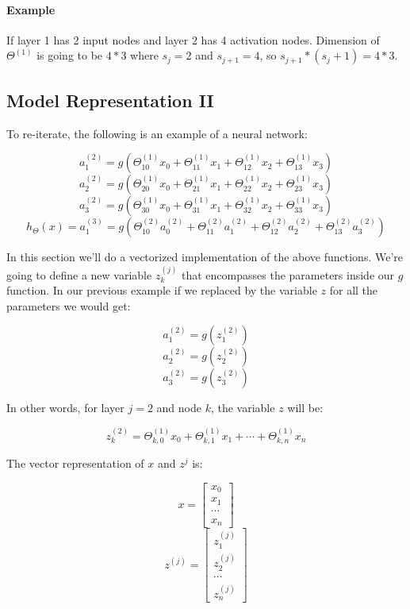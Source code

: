 \documentclass[UTF8]{article}
\begin{document}
\paragraph{Example} If layer 1 has 2 input nodes and layer 2 has 4 activation nodes. Dimension of $\Theta^{(1)}$ is going to be $4*3$ where $s_j=2$ and $s_{j+1}=4$, so $s_{j+1}*(s_j+1)=4*3$.

\subsection{Model Representation II}

To re-iterate, the following is an example of a neural network:

\[a_1^{(2)} = g(\Theta_{10}^{(1)}x_0 + \Theta_{11}^{(1)}x_1 + \Theta_{12}^{(1)}x_2 + \Theta_{13}^{(1)}x_3) \]
\[ a_2^{(2)} = g(\Theta_{20}^{(1)}x_0 + \Theta_{21}^{(1)}x_1 + \Theta_{22}^{(1)}x_2 + \Theta_{23}^{(1)}x_3) \]
\[ a_3^{(2)} = g(\Theta_{30}^{(1)}x_0 + \Theta_{31}^{(1)}x_1 + \Theta_{32}^{(1)}x_2 + \Theta_{33}^{(1)}x_3) \]
\[ h_\Theta(x) = a_1^{(3)} = g(\Theta_{10}^{(2)}a_0^{(2)} + \Theta_{11}^{(2)}a_1^{(2)} + \Theta_{12}^{(2)}a_2^{(2)} + \Theta_{13}^{(2)}a_3^{(2)}) \]

In this section we'll do a vectorized implementation of the above functions. We're going to define a new variable $z^{(j)}_k$ that encompasses the parameters inside our $g$ function. In our previous example if we replaced by the variable $z$ for all the parameters we would get:

\[a_1^{(2)} = g(z_1^{(2)}) \]
\[ a_2^{(2)} = g(z_2^{(2)}) \]
\[ a_3^{(2)} = g(z_3^{(2)}) \]

In other words, for layer $j=2$ and node $k$, the variable $z$ will be:

\[z_k^{(2)} = \Theta_{k,0}^{(1)}x_0 + \Theta_{k,1}^{(1)}x_1 + \cdots + \Theta_{k,n}^{(1)}x_n\]

The vector representation of $x$ and $z^j$ is:

\[x = \begin{bmatrix}x_0 \\ x_1 \\ \cdots \\ x_n\end{bmatrix} \]
\[z^{(j)} = \begin{bmatrix}z_1^{(j)} \\ z_2^{(j)} \\ \cdots \\ z_n^{(j)}\end{bmatrix}\]
\end{document}
